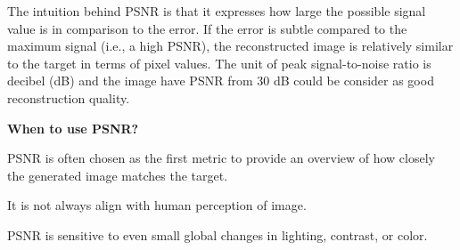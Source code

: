\begin{center}
\end{center}

\vspace{-10pt}

The intuition behind PSNR is that it expresses how large the possible signal value is in comparison to the error. 
If the error is subtle compared to the maximum signal (i.e., a high PSNR), the reconstructed image is relatively similar to the target in terms of pixel values.
The unit of peak signal-to-noise ratio is decibel (dB) and the image have PSNR from 30 dB could be consider as good reconstruction quality.



\textbf{When to use PSNR?}

PSNR is often chosen as the first metric to provide an overview of how closely the generated image matches the target.

{
\item It is not always align with human perception of image.
\item PSNR is sensitive to even small global changes in lighting, contrast, or color.
}

\clearpage

\thispagestyle{customstyle}


